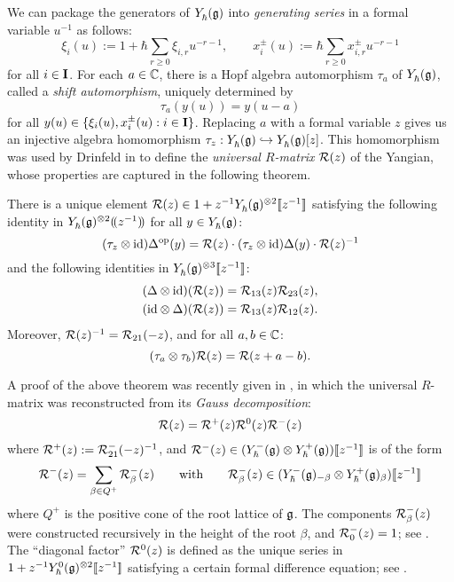 We can package the generators of $\Yhg$ into \emph{generating series} in a formal variable $u^{-1}$ as follows:
\begin{equation}\label{eqn:gen-series}
    \xi_i(u) := 1+\hbar\sum_{r\geq 0}\xi_{i,r}u^{-r-1}, \qquad x^\pm_i(u) := \hbar\sum_{r\geq 0}x^\pm_{i,r}u^{-r-1}
\end{equation}
for all $i\in\I$.
For each $a\in\C$, there is a Hopf algebra automorphism $\tau_a$ of $\Yhg$, called a \emph{shift automorphism}, uniquely determined by
\[\tau_a(y(u)) = y(u-a)\]
for all $y(u)\in\{\xi_i(u),x^\pm_i(u) : i\in\I\}$.
Replacing $a$ with a formal variable $z$ gives us an injective algebra homomorphism $\tau_z:\Yhg\inj\Yhg[][z]$.
This homomorphism was used by Drinfeld in \cite{drinfeld_hopf_1985} to define the \emph{universal $R$-matrix} $\rmat(z)$ of the Yangian, whose properties are captured in the following theorem.

\begin{theorem}\label{T:R}
    There is a unique element $\rmat(z)\in 1+z^{-1}\Yhg^{\otimes 2}\db{z^{-1}}$ satisfying the following identity in $\Yhg^{\otimes 2}\dparen{z^{-1}}$ for all $y\in\Yhg$:
    \[(\tau_z\otimes{\id})\Delta^{\mathrm{op}}(y) = \rmat(z) \cdot (\tau_z\otimes{\id})\Delta(y) \cdot \rmat(z)^{-1}\]
    and the following identities in $\Yhg^{\otimes 3}\db{z^{-1}}$:
    \begin{gather*}
        (\Delta\otimes{\id})(\rmat(z)) = \rmat_{13}(z)\rmat_{23}(z), \\
        ({\id}\otimes\Delta)(\rmat(z)) = \rmat_{13}(z)\rmat_{12}(z).
    \end{gather*}
    Moreover, $\rmat(z)^{-1} = \rmat_{21}(-z)$, and for all $a,b\in\C$:
    \[(\tau_a\otimes\tau_b)\rmat(z) = \rmat(z+a-b).\]
\end{theorem}

A proof of the above theorem was recently given in \cite{gautam_meromorphic_2021}, in which the universal $R$-matrix was reconstructed from its \emph{Gauss decomposition}:
\[\rmat(z) = \rmat^+(z)\rmat^0(z)\rmat^-(z)\]
where $\rmat^+(z) := \rmat^-_{21}(-z)^{-1}$, and $\rmat^-(z)\in(\Yhg[-]\otimes\Yhg[+])\db{z^{-1}}$ is of the form
\[\rmat^-(z) = \sum_{\beta\in Q^+}\rmat_\beta^-(z) \qquad\text{with}\qquad \rmat_\beta^-(z) \in(\Yhg[-]_{-\beta}\otimes\Yhg[+]_\beta)\db{z^{-1}}\]
where $Q^+$ is the positive cone of the root lattice of $\g$.
The components $\rmat_\beta^-(z)$ were constructed recursively in the height of the root $\beta$, and $\rmat_0^-(z)=1$; see \cite[\S 4.2]{gautam_meromorphic_2021}.
The ``diagonal factor'' $\rmat^0(z)$ is defined as the unique series in $1+z^{-1}\Yhg[0]^{\otimes 2}\db{z^{-1}}$ satisfying a certain formal difference equation; see \cite[\S6]{gautam_meromorphic_2021}.


